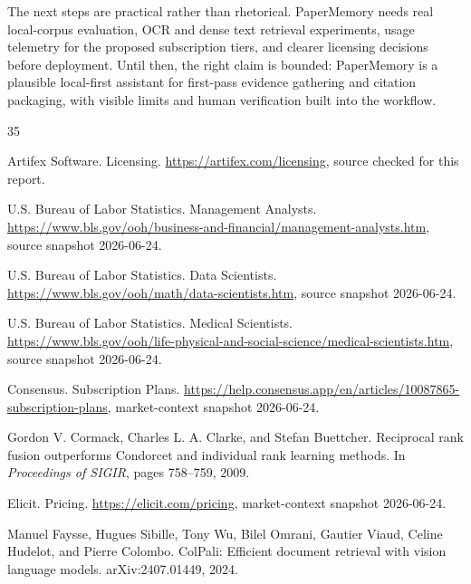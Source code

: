 \documentclass{article}
\begin{document}
The next steps are practical rather than rhetorical. PaperMemory needs real local-corpus evaluation, OCR and dense text retrieval experiments, usage telemetry for the proposed subscription tiers, and clearer licensing decisions before deployment. Until then, the right claim is bounded: PaperMemory is a plausible local-first assistant for first-pass evidence gathering and citation packaging, with visible limits and human verification built into the workflow.

\begin{thebibliography}{35}

Artifex Software.
\newblock Licensing.
\newblock \url{https://artifex.com/licensing}, source checked for this report.

U.S. Bureau of Labor Statistics.
\newblock Management Analysts.
\newblock \url{https://www.bls.gov/ooh/business-and-financial/management-analysts.htm}, source snapshot 2026-06-24.

U.S. Bureau of Labor Statistics.
\newblock Data Scientists.
\newblock \url{https://www.bls.gov/ooh/math/data-scientists.htm}, source snapshot 2026-06-24.

U.S. Bureau of Labor Statistics.
\newblock Medical Scientists.
\newblock \url{https://www.bls.gov/ooh/life-physical-and-social-science/medical-scientists.htm}, source snapshot 2026-06-24.

Consensus.
\newblock Subscription Plans.
\newblock \url{https://help.consensus.app/en/articles/10087865-subscription-plans}, market-context snapshot 2026-06-24.

Gordon V. Cormack, Charles L. A. Clarke, and Stefan Buettcher.
\newblock Reciprocal rank fusion outperforms Condorcet and individual rank learning methods.
\newblock In \emph{Proceedings of SIGIR}, pages 758--759, 2009.

Elicit.
\newblock Pricing.
\newblock \url{https://elicit.com/pricing}, market-context snapshot 2026-06-24.

Manuel Faysse, Hugues Sibille, Tony Wu, Bilel Omrani, Gautier Viaud, Celine Hudelot, and Pierre Colombo.
\newblock ColPali: Efficient document retrieval with vision language models.
\newblock arXiv:2407.01449, 2024.


\end{thebibliography}
\end{document}
